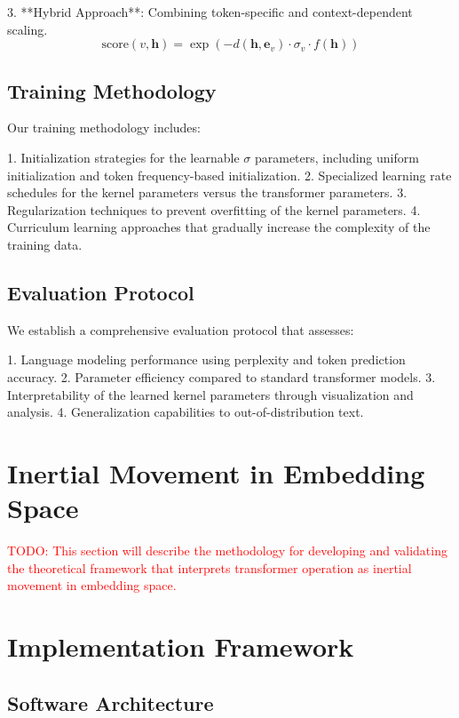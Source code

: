 3. **Hybrid Approach**: Combining token-specific and context-dependent scaling.
   \begin{equation}
       \text{score}(v, \mathbf{h}) = \exp(-d(\mathbf{h}, \mathbf{e}_v) \cdot \sigma_v \cdot f(\mathbf{h}))
   \end{equation}

\subsection{Training Methodology}

Our training methodology includes:

1. Initialization strategies for the learnable $\sigma$ parameters, including uniform initialization and token frequency-based initialization.
2. Specialized learning rate schedules for the kernel parameters versus the transformer parameters.
3. Regularization techniques to prevent overfitting of the kernel parameters.
4. Curriculum learning approaches that gradually increase the complexity of the training data.

\subsection{Evaluation Protocol}

We establish a comprehensive evaluation protocol that assesses:

1. Language modeling performance using perplexity and token prediction accuracy.
2. Parameter efficiency compared to standard transformer models.
3. Interpretability of the learned kernel parameters through visualization and analysis.
4. Generalization capabilities to out-of-distribution text.

\section{Inertial Movement in Embedding Space}

\textcolor{red}{TODO: This section will describe the methodology for developing and validating the theoretical framework that interprets transformer operation as inertial movement in embedding space.}

\section{Implementation Framework}

\subsection{Software Architecture}

